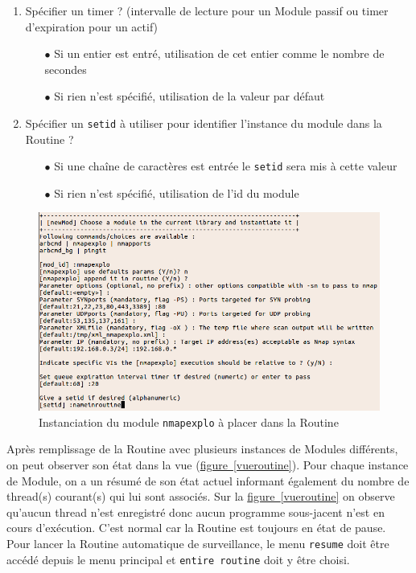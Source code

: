 \documentclass[]{article}
\newcommand{\wordlink}[2]{\hyperref[#1]{#2~\ref{#1}}}
\begin{document}
\begin{enumerate}
\begin{itemize}
	\end{itemize}
\vspace{0.2cm}
\item Spécifier un timer ? (intervalle de lecture pour un Module passif ou timer d'expiration pour un actif)
	\begin{itemize}
	\item[$\bullet$] Si un entier est entré, utilisation de cet entier comme le nombre de secondes
	\item[$\bullet$] Si rien n'est spécifié, utilisation de la valeur par défaut
	\end{itemize}
\vspace{0.2cm}
\item Spécifier un \texttt{setid} à utiliser pour identifier l'instance du module dans la Routine ?
	\begin{itemize}
	\item[$\bullet$] Si une chaîne de caractères est entrée le \texttt{setid} sera mis à cette valeur
	\item[$\bullet$] Si rien n'est spécifié, utilisation de l'id du module
	\end{itemize}
\vspace{0.2cm}
\end{enumerate}

\begin{figure}[!ht]
\centering
     \includegraphics[width=0.8\linewidth]{newmod}
     \caption{Instanciation du module \texttt{nmapexplo} à placer dans la Routine}
     \label{newmod}
\end{figure}


Après remplissage de la Routine avec plusieurs instances de Modules différents, on peut observer son état dans la vue (\wordlink{vueroutine}{figure}). Pour chaque instance de Module, on a un résumé de son état actuel informant également du nombre de thread(s) courant(s) qui lui sont associés. Sur la \wordlink{vueroutine}{figure} on observe qu'aucun thread n'est enregistré donc aucun programme sous-jacent n'est en cours d'exécution. C'est normal car la Routine est toujours en état de pause. Pour lancer la Routine automatique de surveillance, le menu \texttt{resume} doit être accédé depuis le menu principal et \texttt{entire routine} doit y être choisi. 
\end{document}
